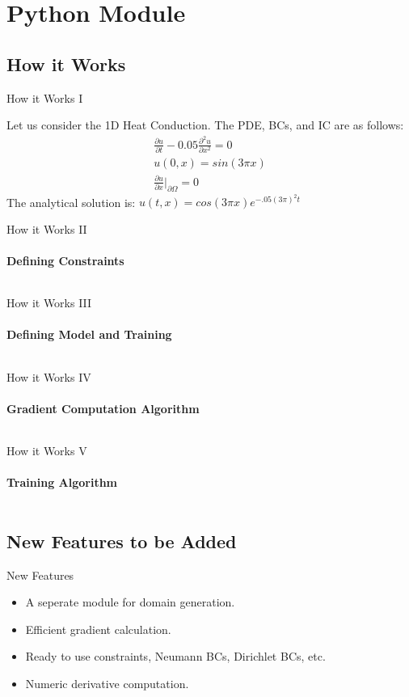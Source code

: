 \documentclass{beamer}
\begin{document}
\section{Python Module}

\subsection{How it Works}

\begin{frame}{How it Works I}

\begin{example}
\small
Let us consider the 1D Heat Conduction. The PDE, BCs, and IC are as follows:
\begin{align*}
\frac{\partial u}{\partial t} - 0.05\frac{\partial^2 u}{\partial x^2} = 0 \\
u(0,x) = sin(3\pi x) \\
\frac{\partial u}{\partial x}\bigg|_{\partial \Omega} = 0
\end{align*}
The analytical solution is: $u(t, x) = cos(3\pi x)e^{-.05(3\pi)^2t}$
\end{example}

\end{frame}

\begin{frame}{How it Works II}
\framesubtitle{Defining Constraints}
\small
\inputminted{python}{heat_constraints.py}
\end{frame}

\begin{frame}{How it Works III}
\framesubtitle{Defining Model and Training}
\small
\inputminted{python}{heat_training.py}
\end{frame}


\begin{frame}{How it Works IV}
\framesubtitle{Gradient Computation Algorithm}
\tiny
\inputminted{python}{gradient.py}
\end{frame}

\begin{frame}{How it Works V}
\framesubtitle{Training Algorithm}
\small
\inputminted{python}{training.py}
\end{frame}

\subsection{New Features to be Added}

\begin{frame}{New Features}

\begin{itemize}
    \item A seperate module for domain generation.
    \item Efficient gradient calculation.
    \item Ready to use constraints, Neumann BCs, Dirichlet BCs, etc.
    \item Numeric derivative computation.
\end{itemize}

\end{frame}
\end{document}
